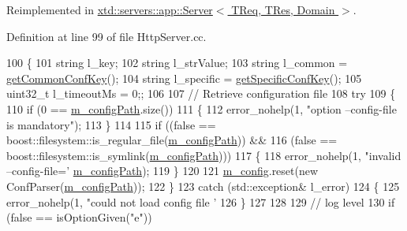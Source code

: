Reimplemented in \hyperlink{classxtd_1_1servers_1_1app_1_1Server_a04ac2d5b3a0a229a3b54ef33b9b7056d}{xtd\-::servers\-::app\-::\-Server$<$ T\-Req, T\-Res, Domain $>$}.



Definition at line 99 of file Http\-Server.\-cc.


\begin{DoxyCode}
100 \{
101   \textcolor{keywordtype}{string}   l\_key;
102   \textcolor{keywordtype}{string}   l\_strValue;
103   \textcolor{keywordtype}{string}   l\_common    = \hyperlink{classxtd_1_1servers_1_1app_1_1HttpServer_a3c838a2599ff485454ca19790ae0529c}{getCommonConfKey}();
104   \textcolor{keywordtype}{string}   l\_specific  = \hyperlink{classxtd_1_1servers_1_1app_1_1HttpServer_a2b8fdc59d125cae41a833da5daf16d97}{getSpecificConfKey}();
105   uint32\_t l\_timeoutMs = 0;;
106 
107   \textcolor{comment}{// Retrieve configuration file}
108   \textcolor{keywordflow}{try}
109   \{
110     \textcolor{keywordflow}{if} (0 == \hyperlink{classxtd_1_1servers_1_1app_1_1HttpServer_aa07526617267875dd907e29b99711ab6}{m\_configPath}.size())
111     \{
112       error\_nohelp(1, \textcolor{stringliteral}{"option --config-file is mandatory"});
113     \}
114 
115     \textcolor{keywordflow}{if} ((\textcolor{keyword}{false} == boost::filesystem::is\_regular\_file(\hyperlink{classxtd_1_1servers_1_1app_1_1HttpServer_aa07526617267875dd907e29b99711ab6}{m\_configPath})) &&
116         (\textcolor{keyword}{false} == boost::filesystem::is\_symlink(\hyperlink{classxtd_1_1servers_1_1app_1_1HttpServer_aa07526617267875dd907e29b99711ab6}{m\_configPath})))
117     \{
118       error\_nohelp(1, \textcolor{stringliteral}{"invalid --config-file='%
      \hyperlink{classxtd_1_1servers_1_1app_1_1HttpServer_aa07526617267875dd907e29b99711ab6}{m\_configPath});
119     \}
120 
121     \hyperlink{classxtd_1_1servers_1_1app_1_1HttpServer_ada282c895467a8d2fcaee543560958dc}{m\_config}.reset(\textcolor{keyword}{new} ConfParser(\hyperlink{classxtd_1_1servers_1_1app_1_1HttpServer_aa07526617267875dd907e29b99711ab6}{m\_configPath}));
122   \}
123   \textcolor{keywordflow}{catch} (std::exception& l\_error)
124   \{
125     error\_nohelp(1, \textcolor{stringliteral}{"could not load config file '%
126   \}
127 
128 
129   \textcolor{comment}{// log level}
130   \textcolor{keywordflow}{if} (\textcolor{keyword}{false} == isOptionGiven(\textcolor{stringliteral}{"e"}))
}}
\end{DoxyCode}
